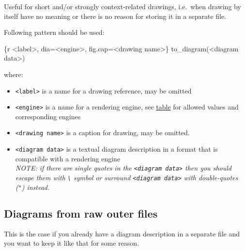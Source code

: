 \documentclass[
  12pt,
  a4paper,
  12pt,
  oneside,
  openany]{book}
\newenvironment{Shaded}{\begin{snugshade}}{\end{snugshade}}
\newcommand{\DataTypeTok}[1]{\textcolor[rgb]{0.27,0.27,0.27}{#1}}
\newcommand{\StringTok}[1]{\textcolor[rgb]{0.5,0.5,0.5}{#1}}
\providecommand{\tightlist}{%
  \setlength{\itemsep}{0pt}\setlength{\parskip}{0pt}}
\begin{document}
Useful for short and/or strongly context-related drawings, i.e.~when drawing by itself have no meaning or there is no reason for storing it in a separate file.

Following pattern should be used:

\begin{Shaded}
\begin{Highlighting}[]
\StringTok{\textasciigrave{}\textasciigrave{}\textasciigrave{}}\DataTypeTok{\{r \textless{}label\textgreater{}, dia=\textquotesingle{}\textless{}engine\textgreater{}\textquotesingle{}, fig.cap=\textquotesingle{}\textless{}drawing name\textgreater{}\textquotesingle{}\}}
\DataTypeTok{  to\_diagram(\textquotesingle{}\textless{}diagram data\textgreater{}\textquotesingle{})}
\StringTok{\textasciigrave{}\textasciigrave{}\textasciigrave{}}
\end{Highlighting}
\end{Shaded}

where:

\begin{itemize}
\tightlist
\item
  \texttt{\textless{}label\textgreater{}} is a name for a drawing reference, may be omitted
\item
  \texttt{\textless{}engine\textgreater{}} is a name for a rendering engine, see \protect\hyperlink{reference-engines}{table} for allowed values and corresponding engines
\item
  \texttt{\textless{}drawing\ name\textgreater{}} is a caption for drawing, may be omitted.
\item
  \texttt{\textless{}diagram\ data\textgreater{}} is a textual diagram description in a format that is compatible with a rendering engine\\
  \emph{NOTE: if there are single quotes in the \texttt{\textless{}diagram\ data\textgreater{}} then you should escape them with \texttt{\textbackslash{}} symbol} \emph{or surround \texttt{\textless{}diagram\ data\textgreater{}} with double-quotes (\texttt{"}) instead.}
\end{itemize}

\hypertarget{usage-embed-raw}{%
\subsection{Diagrams from raw outer files}\label{usage-embed-raw}}

This is the case if you already have a diagram description in a separate file and you want to keep it like that for some reason.
\end{document}
